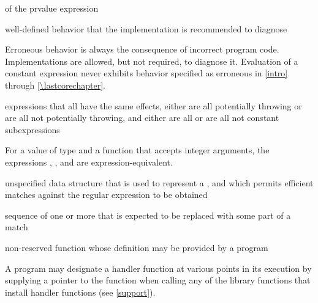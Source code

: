 %
  of the prvalue expression

%
well-defined behavior that the implementation is recommended to diagnose
\begin{defnote}
Erroneous behavior is always the consequence of incorrect program code.
Implementations are allowed, but not required,
to diagnose it.
Evaluation of a constant expression
never exhibits behavior specified as erroneous in \ref{intro} through \ref{\lastcorechapter}.
\end{defnote}

%
expressions that all have the same effects,
either
are all potentially throwing or
are all not potentially throwing,
and
either
are all  or
are all not constant subexpressions

\begin{example}
For a value  of type 
and a function  that accepts integer arguments,
the expressions
,
,
and
are expression-equivalent.
\end{example}

%
unspecified data structure that is used to
represent a , and which permits efficient matches
against the regular expression to be obtained

%
sequence of one or more  that is expected to be
replaced with some part of a  match

%
non-reserved function whose definition may be provided by a \Cpp{} program

\begin{defnote}
A \Cpp{} program may designate a handler function at various points in its execution by
supplying a pointer to the function when calling any of the library functions that install
handler functions (see \ref{support}).
\end{defnote}

